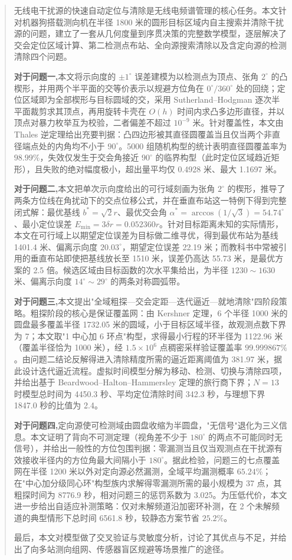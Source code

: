 
\begin{abstract}

无线电干扰源的快速自动定位与清除是无线电频谱管理的核心任务。本文针对机器狗搭载测向机在半径 1800 米的圆形目标区域内自主搜索并清除干扰源的问题，建立了一套从几何度量到序贯决策的完整数学模型，逐层解决了交会定位区域计算、第二检测点布站、全向源搜索清除以及含定向源的检测清除四个问题。

\textbf{对于问题一,}本文将示向度的 $\pm1^\circ$ 误差建模为以检测点为顶点、张角 $2^\circ$ 的凸楔形，并用两个半平面的交等价表示以规避方位角在 $0^\circ/360^\circ$ 处的回绕；定位区域即为全部楔形与目标圆域的交，采用 Sutherland--Hodgman 逐次半平面裁剪求其顶点，再用旋转卡壳在 $O(h)$ 时间内求凸多边形直径，并以顶点对暴力枚举互为校验，二者偏差不超过 $10^{-9}$ 米。针对覆盖性，本文由 Thales 逆定理给出充要判据：凸四边形被其直径圆覆盖当且仅当两个非直径端点处的内角均不小于 $90^\circ$。5000 组随机构型的统计表明直径圆覆盖率为 $98.99\%$，失效仅发生于交会角接近 $90^\circ$ 的临界构型（此时定位区域趋近矩形），且失败的绝对幅度极小，超出量平均仅 0.4928 米、最大 1.1697 米。

\textbf{对于问题二,}本文把单次示向度给出的可行域刻画为张角 $2^\circ$ 的楔形，推导了两条方位线在角扰动下的交点位移公式，并在垂直布站这一特例下得到完整闭式解：最优基线 $b^{*}=\sqrt2r$、最优交会角 $\alpha^{*}=\arccos(1/\sqrt3)=54.74^\circ$、最小定位误差 $E_{\min}=3\delta r=0.052360r$。针对目标距离未知的实际情形，本文在可行域上以期望定位误差为目标做二维寻优，得到最优布站为基线 1401.4 米、偏离示向度 $20.03^\circ$，期望定位误差 22.19 米；而教科书中常被引用的垂直布站即使把基线放长至 1510 米，误差仍高达 55.73 米，是最优方案的 2.5 倍。候选区域由目标函数的次水平集给出，为半径 $1230\sim1630$ 米、偏离示向度 $14^\circ\sim29^\circ$ 的两条对称圆弧带。

\textbf{对于问题三,}本文提出"全域粗探—交会定距—迭代逼近—就地清除"四阶段策略。粗探阶段的核心是保证覆盖网：由 Kershner 定理，6 个半径 1000 米的圆盘最多覆盖半径 1732.05 米的圆域，小于目标区域半径，故观测点数下界为 7；本文取"1 中心加 6 环点"构型，求得最小行程的环半径为 1122.96 米（覆盖半径恰为 1000 米），经 $1.5\times10^6$ 点稠密采样验证覆盖率 $99.999867\%$。由问题二结论反解得进入清除精度所需的逼近距离阈值为 381.97 米，据此设计迭代逼近流程。虚拟时间模型分解为移动、检测、切换与清除四项，并给出基于 Beardwood--Halton--Hammersley 定理的旅行商下界；$N=13$ 时模型总时间为 4450.3 秒、平均定位清除时间 342.3 秒，与理想下界 1847.0 秒的比值为 2.4。

\textbf{对于问题四,}定向源使可检测域由圆盘收缩为半圆盘，"无信号"退化为三义信息。本文证明了背向不可测定理（视角差不少于 $180^\circ$ 的两点不可能同时无信号），并给出一般性的方位包围判据：零漏测当且仅当观测点在干扰源有效接收半径内的方位角最大间隔小于 $180^\circ$。据此检验，问题三的七点覆盖网在半径 1200 米以外对定向源必然漏测，全域平均漏测概率 $65.24\%$；在"中心加分级同心环"构型族内求解得零漏测所需的最小规模为 37 点，其粗探时间为 8776.9 秒，相对问题三的惩罚系数为 3.025。为压低代价，本文进一步给出自适应补测策略：仅对未解频道沿加密环补测，在 2 个未解频道的典型情形下总时间 6561.8 秒，较静态方案节省 $25.2\%$。

最后，本文对模型做了交叉验证与灵敏度分析，讨论了其优点与不足，并给出了向多站测向组网、传感器盲区规避等场景推广的途径。


\end{abstract}
